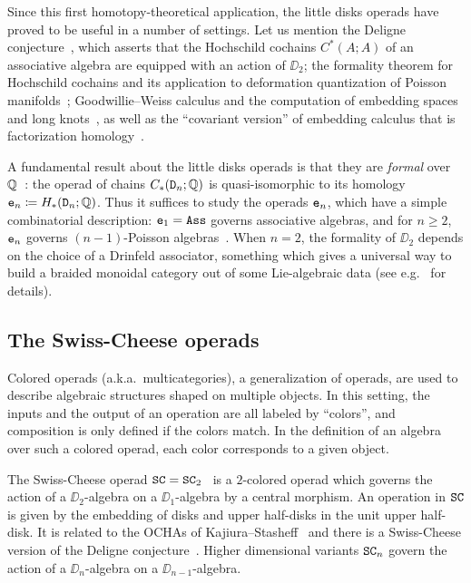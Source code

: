 Since this first homotopy-theoretical application, the little disks operads have proved to be useful in a number of settings.
Let us mention the Deligne conjecture~\cite{KontsevichSoibelman2000,McClureSmith2002}, which asserts that the Hochschild cochains $C^{*}(A;A)$ of an associative algebra are equipped with an action of $\DD_{2}$; the formality theorem for Hochschild cochains and its application to deformation quantization of Poisson manifolds~\cite{Kontsevich1999,Tamarkin1998,Kontsevich2003}; Goodwillie--Weiss calculus and the computation of embedding spaces and long knots~\cite{Sinha2006,LambrechtsTurchinVolic2010,AroneTurchin2014,DwyerHess2012,BoavidaWeiss2013}, as well as the ``covariant version'' of embedding calculus that is factorization homology~\cite{BeilinsonDrinfeld2004,Lurie2009,Lurie2016,AyalaFrancis2015,CostelloGwilliam2017}.

A fundamental result about the little disks operads is that they are \emph{formal} over $\Q$~\cite{Kontsevich1999,Tamarkin2003,LambrechtsVolic2014,FresseWillwacher2015}: the operad of chains $C_{*}(\DD_{n}; \Q)$ is quasi-isomorphic to its homology $\en \coloneqq H_{*}(\DD_{n}; \Q)$.
Thus it suffices to study the operads $\en$, which have a simple combinatorial description: $\en[1] = \Ass$ governs associative algebras, and for $n \ge 2$, $\en$ governs $(n-1)$-Poisson algebras~\cite{Cohen1976}.
When $n = 2$, the formality of $\DD_{2}$ depends on the choice of a Drinfeld associator, something which gives a universal way to build a braided monoidal category out of some Lie-algebraic data (see e.g.~\cite[Chapter~I.10]{Fresse2017} for details).

\subsection{The Swiss-Cheese operads}
\label{sec.swiss-cheese-operads}

Colored operads (a.k.a.\ multicategories), a generalization of operads, are used to describe algebraic structures shaped on multiple objects.
In this setting, the inputs and the output of an operation are all labeled by ``colors'', and composition is only defined if the colors match.
In the definition of an algebra over such a colored operad, each color corresponds to a given object.



The Swiss-Cheese operad $\SC = \SC_{2}$~\cite{Voronov1999} is a $2$-colored operad which governs the action of a $\DD_{2}$-algebra on a $\DD_{1}$-algebra by a central morphism.
An operation in $\SC$ is given by the embedding of disks and upper half-disks in the unit upper half-disk.
It is related to the OCHAs of Kajiura--Stasheff~\cite{KajiuraStasheff2006a,Hoefel2009} and there is a Swiss-Cheese version of the Deligne conjecture~\cite{DolgushevTamarkinTsygan2011}.
Higher dimensional variants $\SC_{n}$ govern the action of a $\DD_{n}$-algebra on a $\DD_{n-1}$-algebra.

